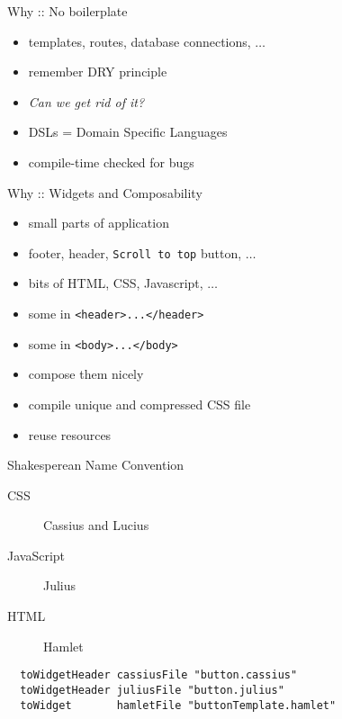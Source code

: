 \documentclass{beamer}
\begin{document}
\begin{frame}{Why :: No boilerplate}
  \begin{center}\end{center}
  \pause
  \begin{itemize}[<+->]
    \item templates, routes, database connections, $\ldots$
    \item remember DRY principle
    \item \textit{Can we get rid of it?}
    \item DSLs = Domain Specific Languages
    \item compile-time checked for bugs
  \end{itemize}
\end{frame}

\begin{frame}{Why :: Widgets and Composability}
  \begin{itemize}[<+->]
    \item small parts of application
    \item footer, header, \texttt{Scroll to top} button, $\ldots$
    \item bits of HTML, CSS, Javascript, $\ldots$
    \item some in \texttt{<header>...</header>}
    \item some in \texttt{<body>...</body>}
    \item compose them nicely
    \item compile unique and compressed CSS file
    \item reuse resources
  \end{itemize}
\end{frame}

\begin{frame}[fragile]{Shakesperean Name Convention}
  \begin{description}
    \item[CSS] Cassius and Lucius
    \item[JavaScript] Julius
    \item[HTML] Hamlet
  \end{description}
  \begin{verbatim}
  toWidgetHeader cassiusFile "button.cassius"
  toWidgetHeader juliusFile "button.julius"
  toWidget       hamletFile "buttonTemplate.hamlet"
  \end{verbatim}
\end{frame}
\end{document}
